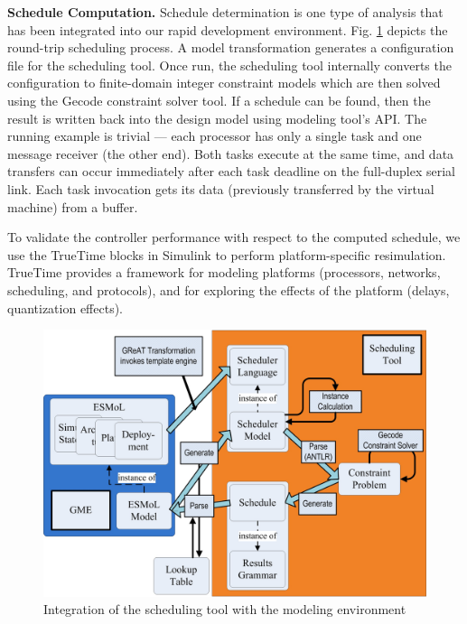 \textbf{Schedule Computation.} Schedule determination is one type of analysis that has been integrated into our rapid development environment.  Fig. \ref{fig:roundtrip} depicts the round-trip scheduling process. A model transformation generates a configuration file for the scheduling tool.  Once run, the scheduling tool internally converts the configuration to finite-domain integer constraint models\cite{offlinescheduling} which are then solved using the Gecode constraint solver tool\cite{gecode}.  If a schedule can be found, then the result is written back into the design model using modeling tool's API.  The running example is trivial --- each processor has only a single task and one message receiver (the other end).  Both tasks execute at the same time, and data transfers can occur immediately after each task deadline on the full-duplex serial link.  Each task invocation gets its data (previously transferred by the virtual machine) from a buffer.

To validate the controller performance with respect to the computed schedule, we use the TrueTime \cite{TrueTime} blocks in Simulink to perform platform-specific resimulation.  TrueTime provides a framework for modeling platforms (processors, networks, scheduling, and protocols), and for exploring the effects of the platform (delays, quantization effects). 

\begin{figure}[ht]
\centering
\includegraphics[width=\columnwidth]{figures/roundtrip.jpg}
    \caption{Integration of the scheduling tool with the modeling environment}
    \label{fig:roundtrip}
\end{figure}

